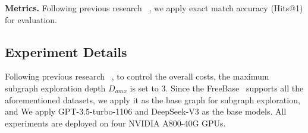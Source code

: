 \noindent\textbf{Metrics.}
Following previous research ~\cite{pog}, we apply exact match accuracy (Hits@1) for evaluation.


\subsection{Experiment Details}
Following previous research ~\cite{pog}, to control the overall costs, the maximum subgraph exploration depth $D_{amx}$ is set to 3. Since the FreeBase~\cite{freebase} supports all the aforementioned datasets, we apply it as the base graph for subgraph exploration, and We apply GPT-3.5-turbo-1106 and DeepSeek-V3 as the base models.
All experiments are deployed on four NVIDIA A800-40G GPUs.